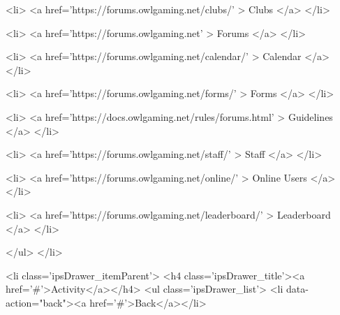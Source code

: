 											
										
											
												
													
													
									
													
									
									
									
										


	
		
			<li>
				<a href='https://forums.owlgaming.net/clubs/' >
					Clubs
				</a>
			</li>
		
	

	
		
			<li>
				<a href='https://forums.owlgaming.net' >
					Forums
				</a>
			</li>
		
	

	
		
			<li>
				<a href='https://forums.owlgaming.net/calendar/' >
					Calendar
				</a>
			</li>
		
	

	
		
			<li>
				<a href='https://forums.owlgaming.net/forms/' >
					Forms
				</a>
			</li>
		
	

	
		
			<li>
				<a href='https://docs.owlgaming.net/rules/forums.html' >
					Guidelines
				</a>
			</li>
		
	

	
		
			<li>
				<a href='https://forums.owlgaming.net/staff/' >
					Staff
				</a>
			</li>
		
	

	
		
			<li>
				<a href='https://forums.owlgaming.net/online/' >
					Online Users
				</a>
			</li>
		
	

	
		
			<li>
				<a href='https://forums.owlgaming.net/leaderboard/' >
					Leaderboard
				</a>
			</li>
		
	

										
								</ul>
							</li>
						
					
				
					
						
						
							<li class='ipsDrawer_itemParent'>
								<h4 class='ipsDrawer_title'><a href='#'>Activity</a></h4>
								<ul class='ipsDrawer_list'>
									<li data-action="back"><a href='#'>Back</a></li>
									
